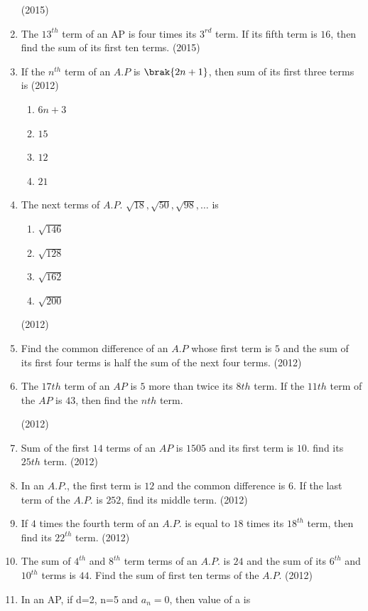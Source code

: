 \begin{enumerate}[label=\thesubsection.\arabic*,ref=\thesubsection.\theenumi,itemsep=1pt]
\hfill(2015) \item The $13^{th}$ term of an AP is four times its $3^{rd}$ term. If its fifth term is $16$, then find the sum of its first ten terms.
\hfill(2015)
 \item If the $n^{th}$ term of an $A.P$ is $\brak{2n+1}$, then sum of its first three terms is 
\hfill(2012)
\begin{multicols}{4}
\begin{enumerate}
 \item $6n + 3$ 
 \item $15$ 
 \item $12$ 
 \item $21$ 
\end{enumerate}
\end{multicols}
 \item The next terms of $A.P.$ $\sqrt {18}, \sqrt {50}, \sqrt {98}, \ldots$ is 
\begin{multicols}{4}
\begin{enumerate}
 \item $\sqrt {146}$ 
 \item $\sqrt {128}$ 
 \item $\sqrt {162}$ 
 \item $\sqrt {200}$ 
\end{enumerate}
\end{multicols}
\hfill(2012) \item Find the common difference of an $A.P$ whose first term is $5$ and the sum of its first four terms is half the sum of the next four terms. 
\hfill(2012) \item The $17th$ term of an $AP$ is $5$ more than twice its $8th$ term. If the $11th$ term of the $AP$ is $43$, then find the $nth$ term. 

\hfill(2012) \item Sum of the first $14$ terms of an $AP$ is $1505$ and its first term is $10$. find its $25th$ term. 
\hfill(2012) \item In an $A.P.$, the first term is $12$ and the common difference is $6$. If the last term of the $A.P.$ is $252$, find its middle term. 
\hfill(2012) \item If $4$ times the fourth term of an $A.P.$ is equal to $18$ times its $18^{th}$ term, then find its $22^{th}$ term. 
\hfill(2012) \item The sum of $4^{th}$ and $8^{th}$ term terms of an $A.P.$ is $24$ and the sum of its $6^{th}$ and $10^{th}$ terms is $44$. Find the sum of first ten terms of the $A.P.$ 
\hfill(2012)
\item In an AP, if d=2, n=5 and $a_n=0$, then value of a is
    \begin{multicols}{4}
\begin{enumerate}


\end{enumerate}
\end{multicols}
\end{enumerate}

